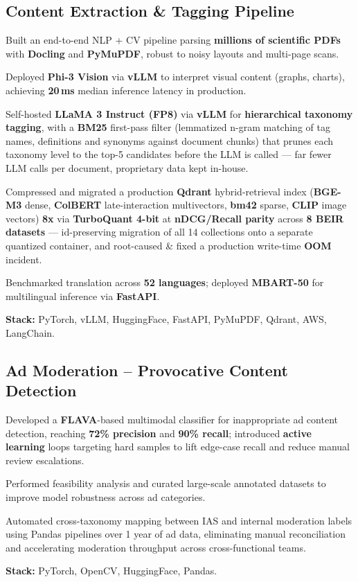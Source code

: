 \documentclass[letter,10pt]{article}
\begin{document}
\subsection{Content Extraction \& Tagging Pipeline}
\begin{zitemize}
\item Built an end-to-end NLP + CV pipeline parsing \textbf{millions of scientific PDFs} with \textbf{Docling} and \textbf{PyMuPDF}, robust to noisy layouts and multi-page scans.
\item Deployed \textbf{Phi-3 Vision} via \textbf{vLLM} to interpret visual content (graphs, charts), achieving \textbf{20\,ms} median inference latency in production.
\item Self-hosted \textbf{LLaMA 3 Instruct (FP8)} via \textbf{vLLM} for \textbf{hierarchical taxonomy tagging}, with a \textbf{BM25} first-pass filter (lemmatized n-gram matching of tag names, definitions and synonyms against document chunks) that prunes each taxonomy level to the top-5 candidates before the LLM is called --- far fewer LLM calls per document, proprietary data kept in-house.
\item Compressed and migrated a production \textbf{Qdrant} hybrid-retrieval index (\textbf{BGE-M3} dense, \textbf{ColBERT} late-interaction multivectors, \textbf{bm42} sparse, \textbf{CLIP} image vectors) \textbf{8x} via \textbf{TurboQuant 4-bit} at \textbf{nDCG/Recall parity} across \textbf{8 BEIR datasets} --- id-preserving migration of all 14 collections onto a separate quantized container, and root-caused \& fixed a production write-time \textbf{OOM} incident.
\item Benchmarked translation across \textbf{52 languages}; deployed \textbf{MBART-50} for multilingual inference via \textbf{FastAPI}.
\item \textbf{Stack:} PyTorch, vLLM, HuggingFace, FastAPI, PyMuPDF, Qdrant, AWS, LangChain.
\end{zitemize}

\subsection{Ad Moderation -- Provocative Content Detection}
\begin{zitemize}
\item Developed a \textbf{FLAVA}-based multimodal classifier for inappropriate ad content detection, reaching \textbf{72\% precision} and \textbf{90\% recall}; introduced \textbf{active learning} loops targeting hard samples to lift edge-case recall and reduce manual review escalations.
\item Performed feasibility analysis and curated large-scale annotated datasets to improve model robustness across ad categories.
\item Automated cross-taxonomy mapping between IAS and internal moderation labels using Pandas pipelines over 1 year of ad data, eliminating manual reconciliation and accelerating moderation throughput across cross-functional teams.
\item \textbf{Stack:} PyTorch, OpenCV, HuggingFace, Pandas.
\end{zitemize}
\end{document}
